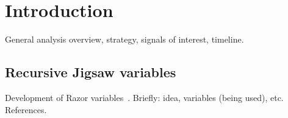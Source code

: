 \section{Introduction}\label{sec:intro}

General analysis overview, strategy, signals of interest, timeline.


\subsection{Recursive Jigsaw variables}
Development of Razor variables~\cite{bib:Crogan}.
Briefly: idea, variables (being used), etc. References. 
